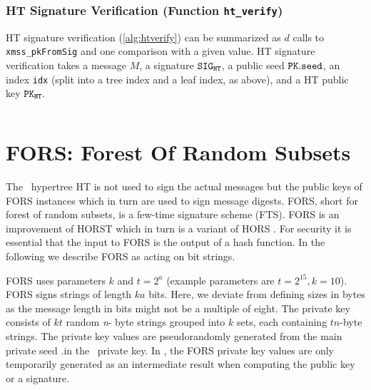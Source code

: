 \begin{algorithm}
    \inputminted[breaklines,linenos,tabsize=2,mathescape,escapeinside=||]{C}{paper/code/ht_sign.cs}
    \caption{\texttt{ht\_sign} --- Generating an HT signature.}
    \label{alg:htsign}
\end{algorithm}

\subsubsection{HT Signature Verification (Function \texttt{ht\_verify})}

HT signature verification (\cref{alg:htverify}) can be summarized as $d$ calls to \texttt{xmss\_pkFromSig} and one comparison with a given value. HT signature verification takes a message $M$, a signature $\mathtt{SIG}_\mathtt{HT}$, a public seed $\pk.\seed$, an index \texttt{idx} (split into a tree index and a leaf index, as above), and a HT public key $\pk_{\mathtt{HT}}.$

\begin{algorithm}
    \inputminted[breaklines,linenos,tabsize=2,mathescape,escapeinside=||]{C}{paper/code/ht_verify.cs}
    \caption{\texttt{ht\_verify} --- Verifying a HT signature $\bf {SIG}_{HT}$ on a message $M$ using a HT public key ${\bf PK}_{HT}$.}
    \label{alg:htverify}
\end{algorithm}
\section{FORS: Forest Of Random Subsets}
\label{sec:fors}

The \SPHINCSA\ hypertree HT is not used to sign the actual messages but the public keys of FORS instances which in turn are used to sign message digests. FORS, short for forest of random subsets, is a few-time signature scheme (FTS). FORS is an improvement of HORST \cite{EC:BHHLNP15} which in turn is a variant of HORS \cite{EPRINT:ReyRey02}. For security it is essential that the input to FORS is the output of a hash function. In the following we describe FORS as acting on bit strings.

FORS uses parameters $k$ and $t=2^{a}$ (example parameters are $t=2^{15}, k=10$). FORS signs strings of length $ka$ bits. Here, we deviate from defining sizes in bytes as the message length in bits might not be a multiple of eight. The private key consists of $kt$ random {\it n}- byte strings grouped into $k$ sets, each containing $t n$-byte strings. The private key values are pseudorandomly generated from the main private seed \sk.\seed in the \SPHINCSA\ private key. In \SPHINCSA, the FORS private key values are only temporarily generated as an intermediate result when computing the public key or a signature.

